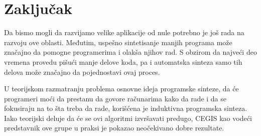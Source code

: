 \section{Zaključak}
\label{sec:zakljucak}

Da bismo mogli da razvijamo velike aplikacije od nule potrebno je još rada na razvoju ove oblasti. Međutim, uspešno sintetisanje manjih programa može značajno da pomogne programerima i olakša njihov rad. S obzirom da najveći deo vremena provedu pišući manje delove koda, pa i automatska sinteza samo tih delova može značajno da pojednostavi ovaj proces.

U teorijskom razmatranju problema osnovne ideja programske sinteze, da će programeri moći da prestanu da govore računarima kako da rade i da se fokusiraju na to šta treba da rade, korišćena je induktivna programska sinteza. Iako teorijski deluje da će se ovi algoritmi izvršavati predugo, CEGIS kao vodeći predstavnik ove grupe u praksi je pokazao neočekivano dobre rezultate.
